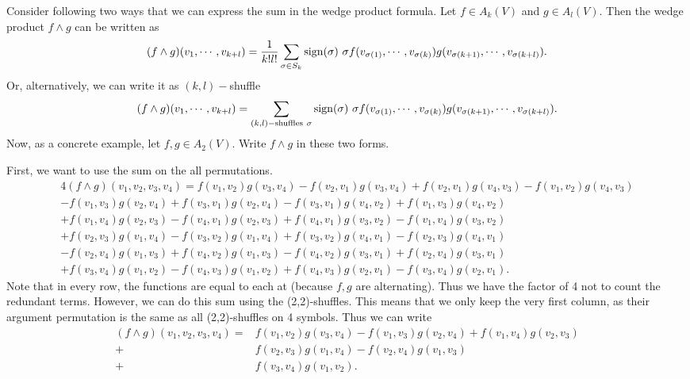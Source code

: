 \begin{problem}
	Consider following two ways that we can express the sum in the wedge product formula. Let $ f \in A_k(V) $ and $ g \in A_l(V) $. Then the wedge product $ f \wedge g $ can be written as
	\[ (f \wedge g)(v_1,\cdots,v_{k+l}) = \frac{1}{k!l!}\sum_{\sigma \in S_k}\operatorname{sign}(\sigma)\ \sigma f(v_{\sigma(1)},\cdots,v_{\sigma(k)})g(v_{\sigma(k+1)},\cdots,v_{\sigma(k+l)}). \]
	Or, alternatively, we can write it as $ (k,l)-$shuffle
	\[ (f \wedge g)(v_1,\cdots,v_{k+l}) = \sum_{(k,l)- \text{shuffles} \ \sigma}\operatorname{sign}(\sigma)\ \sigma f(v_{\sigma(1)},\cdots,v_{\sigma(k)})g(v_{\sigma(k+1)},\cdots,v_{\sigma(k+l)}). \]
	Now, as a concrete example, let $ f,g \in A_2(V) $. Write $ f\wedge g $ in these two forms.
\end{problem}

\begin{solution}
	First, we want to use the sum on the all permutations. 
	\begin{align*}
		 4(f \wedge g)(v_1, v_2, v_3, v_4) = f(v_1,v_2)g(v_3,v_4) - f(v_2,v_1)g(v_3,v_4) + f(v_2,v_1)g(v_4,v_3) - f(v_1,v_2)g(v_4,v_3)  \\
		 - f(v_1,v_3)g(v_2,v_4) + f(v_3,v_1)g(v_2,v_4) - f(v_3,v_1)g(v_4,v_2) + f(v_1,v_3)g(v_4,v_2)   \\
		 + f(v_1,v_4)g(v_2,v_3) - f(v_4,v_1)g(v_2,v_3) + f(v_4,v_1)g(v_3,v_2) - f(v_1,v_4)g(v_3,v_2)  \\
		 +f(v_2,v_3)g(v_1,v_4) - f(v_3,v_2)g(v_1,v_4) + f(v_3,v_2)g(v_4,v_1) - f(v_2,v_3)g(v_4,v_1)   \\
		 - f(v_2,v_4)g(v_1,v_3) + f(v_4,v_2)g(v_1,v_3) - f(v_4,v_2)g(v_3,v_1) + f(v_2,v_4)g(v_3,v_1)  \\
		 +f(v_3,v_4)g(v_1,v_2) - f(v_4,v_3)g(v_1,v_2) + f(v_4,v_3)g(v_2,v_1) - f(v_3,v_4)g(v_2,v_1).
	\end{align*}
	Note that in every row, the functions are equal to each at (because $ f,g $ are alternating). Thus we have the factor of 4 not to count the redundant terms. However, we can do this sum using the (2,2)-shuffles. This means that we only keep the very first column, as their argument permutation is the same as all (2,2)-shuffles on 4 symbols. Thus we can write
	\begin{align*}
		(f\wedge g)(v_1,v_2,v_3,v_4) = &f(v_1,v_2)g(v_3,v_4) - f(v_1,v_3)g(v_2,v_4) + f(v_1,v_4)g(v_2,v_3)\\
		 + &f(v_2,v_3)g(v_1,v_4) - f(v_2,v_4)g(v_1,v_3)\\
		 + &f(v_3,v_4)g(v_1,v_2).
	\end{align*}
\end{solution}
